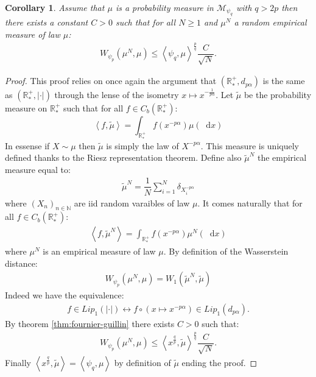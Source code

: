 \documentclass[11pt,a4paper]{article}
\newcommand{\RRP}{\mathbb{R}^+_*}
\newcommand{\MC}{\mathcal{M}}
\newcommand{\Seq}[1]{\left(#1\right)_{n\in \mathbb{N}}}
\newcommand{\brac}[1]{\left\langle#1\right\rangle}
\newcommand{\dd}{\mathop{}\!\mathrm{d}}
\newtheorem{corollary}[theorem]{Corollary}
\begin{document}
\begin{corollary}\label{cor:fournier_guillin}
    Assume that $\mu$ is a probability measure in $\MC_{\psi_q}$ with $q > 2p$ then there exists a constant $C>0$ such that for all $N \geq 1$ and $\mu^N$ a random empirical measure of law $\mu$:
    \begin{align*}
        W_{\psi_p}\left(\mu^N,\mu \right) \leq \brac{\psi_q,\mu}^{\frac{p}{q}}  \dfrac{C}{\sqrt{N}}.
    \end{align*} 
\end{corollary}
\begin{proof}
    This proof relies on once again the argument that $\left(\RRP,d_{p\alpha}\right)$ is the same as $\left(\RRP,|\cdot|\right)$ through the lense of the isometry $x \mapsto x^{-\frac{1}{p\alpha}}$. Let $\tilde{\mu}$ be the probability measure on $\RRP$ such that for all $f \in C_b(\RRP)$:
    \[\brac{f,\tilde{\mu}} = \int_{\RRP} f(x^{-p\alpha}) \mu(\dd x)\]
    In essense if $X \sim \mu$ then $\tilde{\mu}$ is simply the law of $X^{-p\alpha}$. This measure is uniquely defined thanks to the Riesz representation theorem. Define also $\tilde{\mu}^N$ the empirical measure equal to:
    \begin{align*}
        \tilde{\mu}^N = \dfrac{1}{N} \sum\limits_{i = 1}^N \delta_{X_i^{-p\alpha}}
    \end{align*}
    where $\Seq{X_n}$ are iid random varaibles of law $\mu$. It comes naturally that for all $f \in C_b(\RRP)$:
    \begin{align*}
        \brac{f,\tilde{\mu}^N} = \int_{\RRP} f(x^{-p\alpha}) \mu^N(\dd x)
    \end{align*}
    where $\mu^N$ is  an empirical measure of law $\mu$. By definition of the Wasserstein distance:
    \begin{align*}
        W_{\psi_p}\left(\mu^N,\mu\right) = W_1\left(\tilde{\mu}^N,\tilde{\mu}\right)  
    \end{align*}
    Indeed we have the equivalence:
    \begin{align*}
        f \in Lip_1(|\cdot|) \leftrightarrow f\circ(x \mapsto x^{-p\alpha}) \in Lip_1(d_{p\alpha}).
    \end{align*}
    By theorem \ref{thm:fournier-guillin} there exists $C > 0$ such that:
    \begin{align*}
        W_{\psi_p}\left(\mu^N,\mu\right) \leq \brac{x^{\frac{q}{p}},\tilde{\mu}}^{\frac{p}{q}} \dfrac{C}{\sqrt{N}}.
    \end{align*}
    Finally $\brac{x^{\frac{q}{p}},\tilde{\mu}} = \brac{\psi_q,\mu}$ by definition of $\tilde{\mu}$ ending the proof.
\end{proof}
\end{document}
